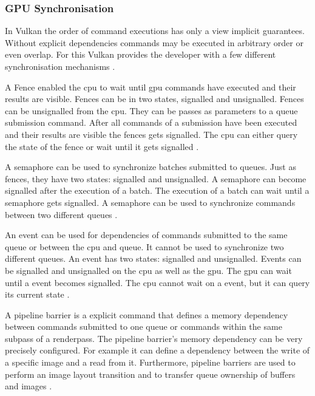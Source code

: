 

\subsubsection{GPU Synchronisation}
\label{section:synchronisation}
In Vulkan the order of command executions has only a view implicit guarantees. Without explicit dependencies commands may be executed in arbitrary order or even overlap. For this Vulkan provides the developer with a few different synchronisation mechanisms \cite{khronos:vulkan:spec1.1}.

A Fence enabled the \gls{cpu} to wait until \gls{gpu} commands have executed and their results are visible. Fences can be in two states, signalled and unsignalled. Fences can be unsignalled from the \gls{cpu}. They can be passes as parameters to a queue submission command. After all commands of a submission have been executed and their results are visible the fences gets signalled. The \gls{cpu} can either query the state of the fence or wait until it gets signalled \cite{khronos:vulkan:spec1.1}.

A semaphore can be used to synchronize batches submitted to queues. Just as fences, they have two states: signalled and unsignalled. A semaphore can become signalled after the execution of a batch. The execution of a batch can wait until a semaphore gets signalled. A semaphore can be used to synchronize commands between two different queues \cite{khronos:vulkan:spec1.1}.

An event can be used for dependencies of commands submitted to the same queue or between the \gls{cpu} and queue. It cannot be used to synchronize two different queues. An event has two states: signalled and unsignalled. Events can be signalled and unsignalled on the \gls{cpu} as well as the \gls{gpu}. The \gls{gpu} can wait until a event becomes signalled. The \gls{cpu} cannot wait on a event, but it can query its current state \cite{khronos:vulkan:spec1.1}.

A pipeline barrier is a explicit command that defines a memory dependency between commands submitted to one queue or commands within the same subpass of a renderpass. The pipeline barrier's memory dependency can be very precisely configured. For example it can define a dependency between the write of a specific image and a read from it. Furthermore, pipeline barriers are used to perform an image layout transition and to transfer queue ownership of buffers and images \cite{khronos:vulkan:spec1.1}.

